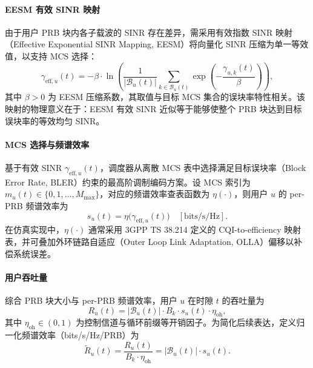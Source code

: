 \documentclass[type=master]{fduthesis}
\begin{document}
\paragraph{EESM 有效 SINR 映射}
由于用户 PRB 块内各子载波的 SINR 存在差异，需采用有效指数 SINR 映射（Effective Exponential SINR Mapping, EESM）将向量化 SINR 压缩为单一等效值，以支持 MCS 选择：
\begin{equation}
\gamma_{\mathrm{eff},u}(t) = -\beta \cdot \ln\left( \frac{1}{|\mathcal{B}_u(t)|} \sum_{k \in \mathcal{B}_u(t)} \exp\left( -\frac{\gamma_{u,k}(t)}{\beta} \right) \right),
\label{eq:ch4_eesm}
\end{equation}
其中 $\beta > 0$ 为 EESM 压缩系数，其取值与目标 MCS 集合的误块率特性相关。该映射的物理意义在于：EESM 有效 SINR 近似等于能够使整个 PRB 块达到目标误块率的等效均匀 SINR。

\paragraph{MCS 选择与频谱效率}
基于有效 SINR $\gamma_{\mathrm{eff},u}(t)$，调度器从离散 MCS 表中选择满足目标误块率（Block Error Rate, BLER）约束的最高阶调制编码方案。设 MCS 索引为 $m_u(t) \in \{0, 1, \ldots, M_{\max}\}$，对应的频谱效率查表函数为 $\eta(\cdot)$，则用户 $u$ 的 per-PRB 频谱效率为
\begin{equation}
s_u(t) = \eta\big(\gamma_{\mathrm{eff},u}(t)\big) \quad [\text{bits/s/Hz}].
\label{eq:ch4_se_mcs}
\end{equation}
在仿真实现中，$\eta(\cdot)$ 通常采用 3GPP TS 38.214 定义的 CQI-to-efficiency 映射表，并可叠加外环链路自适应（Outer Loop Link Adaptation, OLLA）偏移以补偿系统误差。

\paragraph{用户吞吐量}
综合 PRB 块大小与 per-PRB 频谱效率，用户 $u$ 在时隙 $t$ 的吞吐量为
\begin{equation}
R_u(t) = |\mathcal{B}_u(t)| \cdot B_k \cdot s_u(t) \cdot \eta_{\mathrm{oh}},
\label{eq:ch4_throughput}
\end{equation}
其中 $\eta_{\mathrm{oh}} \in (0,1)$ 为控制信道与循环前缀等开销因子。为简化后续表达，定义归一化频谱效率（bits/s/Hz/PRB）为
\begin{equation}
\tilde{R}_u(t) = \frac{R_u(t)}{B_k \cdot \eta_{\mathrm{oh}}} = |\mathcal{B}_u(t)| \cdot s_u(t).
\label{eq:ch4_se_normalized}
\end{equation}

\end{document}
